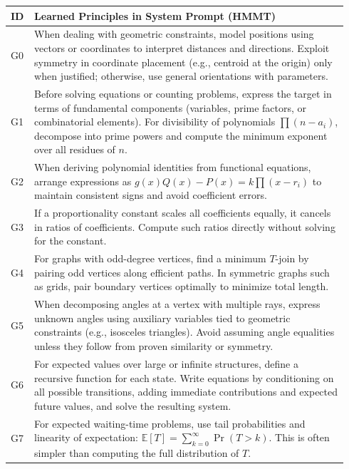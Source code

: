 \documentclass{article}
\theoremstyle{plain}
\theoremstyle{definition}
\theoremstyle{remark}
\begin{document}
\begin{table}[t]
\centering
\small
\setlength{\tabcolsep}{6pt}
\renewcommand{\arraystretch}{1.4}
\begin{tabular}{p{0.04\linewidth} p{0.9\linewidth}}
\toprule
\textbf{ID} & \textbf{Learned Principles in System Prompt (HMMT)} \\
\midrule
G0 & When dealing with geometric constraints, model positions using vectors or coordinates to interpret distances and directions. Exploit symmetry in coordinate placement (e.g., centroid at the origin) only when justified; otherwise, use general orientations with parameters. \\

G1 & Before solving equations or counting problems, express the target in terms of fundamental components (variables, prime factors, or combinatorial elements). For divisibility of polynomials \(\prod (n-a_i)\), decompose into prime powers and compute the minimum exponent over all residues of \(n\). \\

G2 & When deriving polynomial identities from functional equations, arrange expressions as \(g(x)Q(x)-P(x)=k\prod (x-r_i)\) to maintain consistent signs and avoid coefficient errors. \\

G3 & If a proportionality constant scales all coefficients equally, it cancels in ratios of coefficients. Compute such ratios directly without solving for the constant. \\

G4 & For graphs with odd-degree vertices, find a minimum \(T\)-join by pairing odd vertices along efficient paths. In symmetric graphs such as grids, pair boundary vertices optimally to minimize total length. \\

G5 & When decomposing angles at a vertex with multiple rays, express unknown angles using auxiliary variables tied to geometric constraints (e.g., isosceles triangles). Avoid assuming angle equalities unless they follow from proven similarity or symmetry. \\

G6 & For expected values over large or infinite structures, define a recursive function for each state. Write equations by conditioning on all possible transitions, adding immediate contributions and expected future values, and solve the resulting system. \\

G7 & For expected waiting-time problems, use tail probabilities and linearity of expectation:
\(
\mathbb{E}[T]=\sum_{k=0}^{\infty}\Pr(T>k).
\)
This is often simpler than computing the full distribution of \(T\). \\


\end{tabular}
\end{table}
\end{document}
